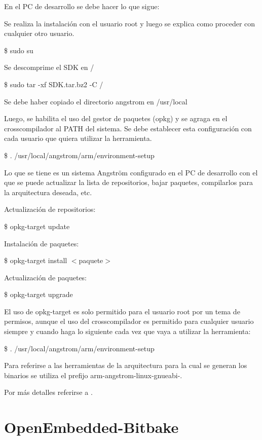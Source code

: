 \bigskip
En el PC de desarrollo se debe hacer lo que sigue:

\bigskip
Se realiza la instalación con el usuario root y luego se explica como proceder con cualquier otro usuario.

\bigskip
\centerline{\$ sudo su}

\bigskip
Se descomprime el SDK en /

\centerline{\$ sudo tar -xf SDK.tar.bz2 -C /}

\bigskip
Se debe haber copiado el directorio angstrom en /usr/local

\bigskip
Luego, se habilita el uso del gestor de paquetes (opkg) y se agraga en el crosscompilador al PATH del sistema. Se debe establecer esta configuración con cada usuario que quiera utilizar la herramienta.

\bigskip
\centerline{\$ . /usr/local/angstrom/arm/environment-setup}

\bigskip
Lo que se tiene es un sistema Angström configurado en el PC de desarrollo con el que se puede actualizar la lista de repositorios, bajar paquetes, compilarlos para la arquitectura deseada, etc.

\bigskip
Actualización de repositorios:

\bigskip
\centerline{\$ opkg-target update}

\bigskip
Instalación de paquetes:

\bigskip
\centerline{\$ opkg-target install $<$paquete$>$}

\bigskip
Actualización de paquetes:

\bigskip
\centerline{\$ opkg-target upgrade}

\bigskip
El uso de opkg-target es solo permitido para el usuario root por un tema de permisos, aunque el uso del crosscompilador es permitido para cualquier usuario siempre y cuando haga lo siguiente cada vez que vaya a utilizar la herramienta:

\bigskip
\centerline{\$ . /usr/local/angstrom/arm/environment-setup}

\bigskip
Para referirse a las herramientas de la arquitectura para la cual se generan los binarios se utiliza el prefijo arm-angstrom-linux-gnueabi-.

\bigskip
Por más detalles referirse a \cite{conf_SDK}.


\section{OpenEmbedded-Bitbake}\label{anx_sw_oe}

